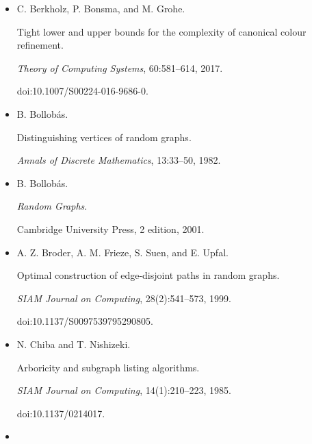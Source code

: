 \documentclass[10pt,a4paper]{article}
\begin{document}
\begin{itemize}
arXiv:2510.20765.





\item[] 
[12]

C. Berkholz, P. Bonsma, and M. Grohe.


Tight lower and upper bounds for the complexity of canonical colour
refinement.


\emph{Theory of Computing Systems}, 60:581–614, 2017.


doi:10.1007/S00224-016-9686-0.





\item[] 
[13]

B. Bollobás.


Distinguishing vertices of random graphs.


\emph{Annals of Discrete Mathematics}, 13:33–50, 1982.





\item[] 
[14]

B. Bollobás.


\emph{Random Graphs}.


Cambridge University Press, 2 edition, 2001.





\item[] 
[15]

A. Z. Broder, A. M. Frieze, S. Suen, and E. Upfal.


Optimal construction of edge-disjoint paths in random graphs.


\emph{SIAM Journal on Computing}, 28(2):541–573, 1999.


doi:10.1137/S0097539795290805.





\item[] 
[16]

N. Chiba and T. Nishizeki.


Arboricity and subgraph listing algorithms.


\emph{SIAM Journal on Computing}, 14(1):210–223, 1985.


doi:10.1137/0214017.





\item[] 
[17]


\end{itemize}
\end{document}
